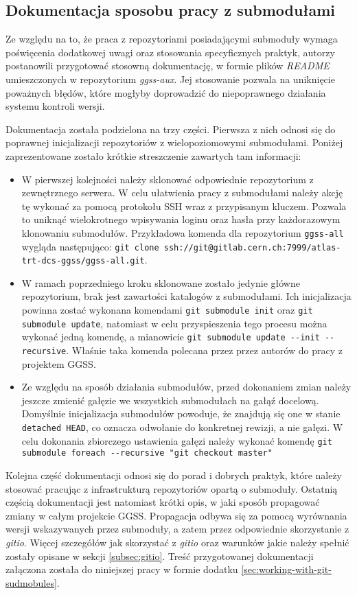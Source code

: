 \subsection{Dokumentacja sposobu pracy z submodułami}
Ze względu na to, że praca z repozytoriami posiadającymi submoduły wymaga poświęcenia dodatkowej uwagi oraz stosowania specyficznych praktyk, autorzy postanowili przygotować stosowną dokumentację, w formie plików \emph{README} umieszczonych w repozytorium \emph{ggss-aux}. Jej stosowanie pozwala na uniknięcie poważnych błędów, które mogłyby doprowadzić do niepoprawnego działania systemu kontroli wersji.

Dokumentacja została podzielona na trzy części. Pierwsza z nich odnosi się do poprawnej inicjalizacji repozytoriów z wielopoziomowymi submodułami. Poniżej zaprezentowane zostało krótkie streszczenie zawartych tam informacji:
\begin{itemize}
    \item W pierwszej kolejności należy sklonować odpowiednie repozytorium z zewnętrznego serwera. W celu ułatwienia pracy z submodułami należy akcję tę wykonać za pomocą protokołu SSH wraz z przypisanym kluczem. Pozwala to uniknąć wielokrotnego wpisywania loginu oraz hasła przy każdorazowym klonowaniu submodułów. Przykładowa komenda dla repozytorium \lstinline{ggss-all} wygląda następująco: \lstinline{git clone ssh://git@gitlab.cern.ch:7999/atlas-trt-dcs-ggss/ggss-all.git}.
    \item W ramach poprzedniego kroku sklonowane zostało jedynie główne repozytorium, brak jest zawartości katalogów z submodułami. Ich inicjalizacja powinna zostać wykonana komendami \lstinline{git submodule init} oraz \lstinline{git submodule update}, natomiast w celu przyspieszenia tego procesu można wykonać jedną komendę, a mianowicie \lstinline{git submodule update --init --recursive}. Właśnie taka komenda polecana przez przez autorów do pracy z projektem GGSS.
    \item Ze względu na sposób działania submodułów, przed dokonaniem zmian należy jeszcze zmienić gałęzie we wszystkich submodułach na gałąź docelową. Domyślnie inicjalizacja submodułów powoduje, że znajdują się one w stanie \lstinline{detached HEAD}, co oznacza odwołanie do konkretnej rewizji, a nie gałęzi. W celu dokonania zbiorczego ustawienia gałęzi należy wykonać komendę \lstinline{git submodule foreach --recursive "git checkout master"}
\end{itemize}

Kolejna część dokumentacji odnosi się do porad i dobrych praktyk, które należy stosować pracując z infrastrukturą repozytoriów opartą o submoduły. Ostatnią częścią dokumentacji jest natomiast krótki opis, w jaki sposób propagować zmiany w całym projekcie GGSS. Propagacja odbywa się za pomocą wyrównania wersji wskazywanych przez submoduły, a zatem przez odpowiednie skorzystanie z \emph{gitio}. Więcej szczegółów jak skorzystać z \emph{gitio} oraz warunków jakie należy spełnić zostały opisane w sekcji \ref{subsec:gitio}. Treść przygotowanej dokumentacji załączona została do niniejszej pracy w formie dodatku \ref{sec:working-with-git-sudmobules}.
